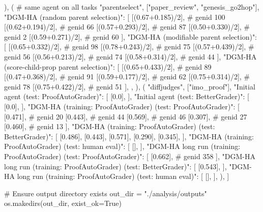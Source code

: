        ),
        (
            # same agent on all tasks
            "parentselect",
            ["paper_review", "genesis_go2hop"],
            {
                "DGM-HA (random parent selection)": [
                    [(0.67+0.185)/2],  # genid 100
                    [(0.62+0.194)/2],  # genid 66
                    [(0.57+0.293)/2],  # genid 87
                    [(0.50+0.330)/2],  # genid 2
                    [(0.59+0.271)/2],  # genid 60
                ],
                "DGM-HA (modifiable parent selection)": [
                    [(0.65+0.332)/2],  # genid 98
                    [(0.78+0.243)/2],  # genid 75
                    [(0.57+0.439)/2],  # genid 56
                    [(0.56+0.213)/2],  # genid 74
                    [(0.58+0.314)/2],  # genid 44
                ],
                "DGM-HA (score-child-prop parent selection)": [
                    [(0.65+0.433)/2],  # genid 89
                    [(0.47+0.368)/2],  # genid 91
                    [(0.59+0.177)/2],  # genid 62
                    [(0.75+0.314)/2],  # genid 78
                    [(0.75+0.422)/2],  # genid 51
                ],
            },
        ),
        (
            "diffjudges",
            ["imo_proof"],
            {
                "Initial agent (test: ProofAutoGrader)": [
                    [0.0],
                ],
                "Initial agent (test: BetterGrader)": [
                    [0.0],
                ],
                "DGM-HA (training: ProofAutoGrader) (test: ProofAutoGrader)": [
                    [0.471],  # genid 20
                    [0.443],  # genid 44
                    [0.569],  # genid 46
                    [0.307],  # genid 27
                    [0.460],  # genid 13
                ],
                "DGM-HA (training: ProofAutoGrader) (test: BetterGrader)": [
                    [0.486],
                    [0.443],
                    [0.571],
                    [0.290],
                    [0.345],
                ],
                "DGM-HA (training: ProofAutoGrader) (test: human eval)": [
                    [],
                ],
                "DGM-HA long run (training: ProofAutoGrader) (test: ProofAutoGrader)": [
                    [0.662],  # genid 358
                ],
                "DGM-HA long run (training: ProofAutoGrader) (test: BetterGrader)": [
                    [0.543],
                ],
                "DGM-HA long run (training: ProofAutoGrader) (test: human eval)": [
                    [],
                ],
            }
        ),
    ]

    # Ensure output directory exists
    out_dir = "./analysis/outputs"
    os.makedirs(out_dir, exist_ok=True)

